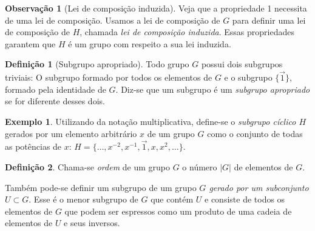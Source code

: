 \documentclass[a4paper,12pt]{report}
\theoremstyle{plain}
\theoremstyle{definition}
\newtheorem{definicao}{Definição}[section]
\newtheorem{observacao}{Observação}[section]
\newtheorem{exemplo}{Exemplo}[section]
\begin{document}
\begin{observacao}[Lei de composição induzida]
	Veja que a propriedade 1 necessita de uma lei de composição. Usamos a
	lei de composição de \(G\) para definir uma lei de composição de \(H\),
	chamada \emph{lei de composição induzida}. Essas propriedades garantem
	que \(H\) é um grupo com respeito a sua lei induzida.
\end{observacao}

\begin{definicao}[Subgrupo apropriado]
	Todo grupo \(G\) possui dois subgrupos triviais: O subgrupo formado por
	todos os elementos de \(G\) e o subgrupo \(\{\vec{1}\}\), formado pela
	identidade de \(G\). Diz-se que um subgrupo é um \emph{subgrupo apropriado} se for diferente desses dois.
\end{definicao}

\begin{exemplo}
	Utilizando da notação multiplicativa, define-se o
	\emph{subgrupo cíclico \(H\)} gerados por um elemento arbitrário \(x\)
	de um grupo \(G\) como o conjunto de todas as potências de \(x\):
	\(H = \{\dots , x^{-2}, x^{-1},\vec{1},x,x^2,\dots\}\).
\end{exemplo}

\begin{definicao}
	Chama-se \emph{ordem} de um grupo \(G\) o número \(|G|\) de elementos de \(G\).
\end{definicao}

Também pode-se definir um subgrupo de um grupo \emph{\(G\) gerado por um
subconjunto \(U \subset G\)}. Esse é o menor subgrupo de \(G\) que
contém \(U\) e consiste de todos os elementos de \(G\) que podem ser
espressos como um produto de uma cadeia de elementos de \(U\) e seus
inversos.
\end{document}
